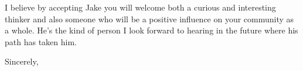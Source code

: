 \documentclass[11pt, letterpaper]{letter} %
\begin{document}
\begin{letter}
I believe by accepting Jake you will welcome both a curious and interesting thinker and also someone who will be a positive influence on your community as a whole. He's the kind of person I look forward to hearing in the future where his path has taken him.  

\closing{Sincerely,}




\end{letter}
\end{document}

